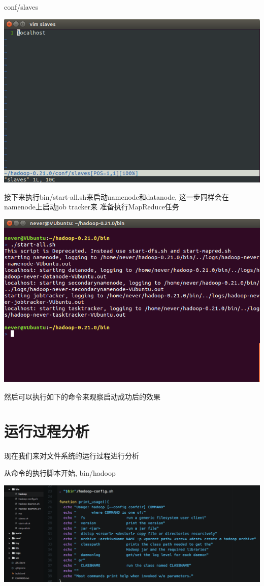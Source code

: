 conf/slaves

\includegraphics[width=\textwidth]{image/env/cr14.png}

接下来执行bin/start-all.sh来启动namenode和datanode, 这一步同样会在namenode上启动job tracker来
准备执行MapReduce任务

\includegraphics[width=\textwidth]{image/env/cr15.png}

然后可以执行如下的命令来观察启动成功后的效果

\section{运行过程分析}

现在我们来对{\Hadoop}文件系统的运行过程进行分析

从{\Hadoop}命令的执行脚本开始, bin/hadoop

\includegraphics[width=\textwidth]{image/env/cr16.png}

